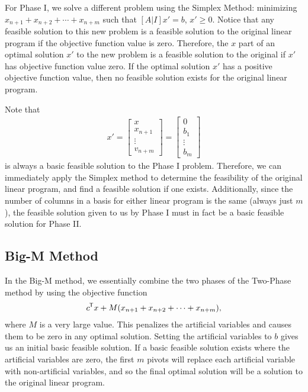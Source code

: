 For Phase I, we solve a different problem using the Simplex Method: minimizing $x_{n+1} + x_{n+2} + \cdots + x_{n+m}$ such that $[A|I]x' = b$, $x' \geq 0$. Notice that any feasible solution to this new problem is a feasible solution to the original linear program if the objective function value is zero. Therefore, the $x$ part of an optimal solution $x'$ to the new problem is a feasible solution to the original if $x'$ has objective function value zero. If the optimal solution $x'$ has a positive objective function value, then no feasible solution exists for the original linear program.

Note that
\begin{align*}
    x' = \begin{bmatrix}
        x \\
        x_{n+1} \\
        \vdots \\
        v_{n+m}
    \end{bmatrix} = \begin{bmatrix}
        0 \\
        b_1 \\
        \vdots \\
        b_m
    \end{bmatrix}
\end{align*}
is always a basic feasible solution to the Phase I problem. Therefore, we can immediately apply the Simplex method to determine the feasibility of the original linear program, and find a feasible solution if one exists. Additionally, since the number of columns in a basis for either linear program is the same (always just $m$), the feasible solution given to us by Phase I must in fact be a basic feasible solution for Phase II.

\subsection{Big-M Method}

In the Big-M method, we essentially combine the two phases of the Two-Phase method by using the objective function
\begin{align*}
    {c}^{\mkern-1.5mu\mathsf{T}}x + M(x_{n+1} + x_{n+2} + \cdots + x_{n+m}),
\end{align*}
where $M$ is a very large value. This penalizes the artificial variables and causes them to be zero in any optimal solution. Setting the artificial variables to $b$ gives us an initial basic feasible solution. If a basic feasible solution exists where the artificial variables are zero, the first $m$ pivots will replace each artificial variable with non-artificial variables, and so the final optimal solution will be a solution to the original linear program.


